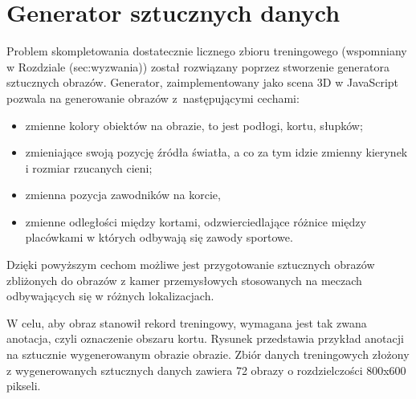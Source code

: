 \newpage
\section{Generator sztucznych danych}
\label{sec:generator}

Problem skompletowania dostatecznie licznego zbioru treningowego (wspomniany w Rozdziale \numberref(sec:wyzwania)) został rozwiązany poprzez stworzenie generatora sztucznych obrazów.
Generator, zaimplementowany jako scena 3D w JavaScript pozwala na generowanie obrazów z~następującymi cechami:

\begin{itemize}
	\item zmienne kolory obiektów na obrazie, to jest podłogi, kortu, słupków;
	\item zmieniające swoją pozycję źródła światła, a co za tym idzie zmienny kierynek i rozmiar rzucanych cieni;
	\item zmienna pozycja zawodników na korcie, 
	\item zmienne odległości między kortami, odzwierciedlające różnice między placówkami w których odbywają się zawody sportowe.
\end{itemize}

Dzięki powyższym cechom możliwe jest przygotowanie sztucznych obrazów zbliżonych do obrazów z kamer przemysłowych stosowanych na meczach odbywających się w różnych lokalizacjach.

W celu, aby obraz stanowił rekord treningowy, wymagana jest tak zwana anotacja, czyli oznaczenie obszaru kortu. Rysunek  przedstawia przykład anotacji na sztucznie wygenerowanym obrazie obrazie.
Zbiór danych treningowych złożony z wygenerowanych sztucznych danych zawiera 72 obrazy o rozdzielczości 800x600 pikseli.

